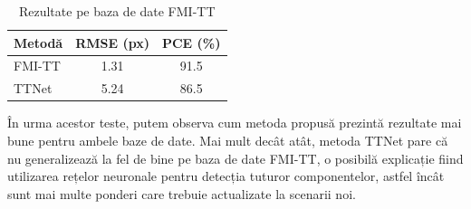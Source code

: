 \begin{table}[H]
  \centering
  \caption{Rezultate pe baza de date FMI-TT}
  \label{tab:fmit2}
  \begin{tabular}{lcc}
    \toprule
    \textbf{Metodă} & \textbf{RMSE (px)} & \textbf{PCE (\%)} \\
    \midrule
    FMI-TT & 1.31 & 91.5 \\
    TTNet        & 5.24 & 86.5 \\
    \bottomrule
  \end{tabular}
\end{table}


În urma acestor teste, putem observa cum metoda propusă prezintă rezultate mai bune pentru ambele baze de date. Mai mult decât atât, metoda TTNet pare că nu generalizează la fel de bine pe baza de date FMI-TT, o posibilă explicație fiind utilizarea rețelor neuronale pentru detecția tuturor componentelor, astfel încât sunt mai multe ponderi care trebuie actualizate la scenarii noi.
